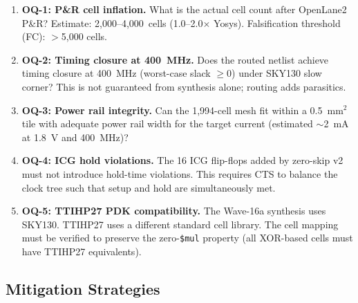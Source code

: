 \begin{enumerate}
  \item \textbf{OQ-1: P\&R cell inflation.}
        What is the actual cell count after OpenLane2 P\&R?
        Estimate: 2,000--4,000~cells (1.0--2.0\(\times\) Yosys).
        Falsification threshold (FC): $>$5,000 cells.

  \item \textbf{OQ-2: Timing closure at 400~MHz.}
        Does the routed netlist achieve timing closure at 400~MHz
        (worst-case slack $\geq 0$) under SKY130 slow corner?
        This is not guaranteed from synthesis alone; routing adds parasitics.

  \item \textbf{OQ-3: Power rail integrity.}
        Can the 1,994-cell mesh fit within a 0.5~mm\(^2\) tile with adequate
        power rail width for the target current (estimated \(\sim\)2~mA at 1.8~V
        and 400~MHz)?

  \item \textbf{OQ-4: ICG hold violations.}
        The 16 ICG flip-flops added by zero-skip v2 must not introduce
        hold-time violations.
        This requires CTS to balance the clock tree such that setup and hold
        are simultaneously met.

  \item \textbf{OQ-5: TTIHP27 PDK compatibility.}
        The Wave-16a synthesis uses SKY130.
        TTIHP27 uses a different standard cell library.
        The cell mapping must be verified to preserve the zero-\texttt{\$mul}
        property (all XOR-based cells must have TTIHP27 equivalents).
\end{enumerate}

\subsection{Mitigation Strategies}

